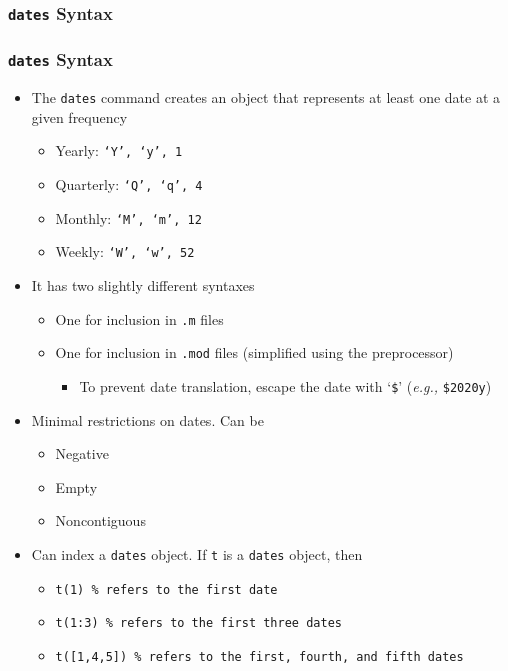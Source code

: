 \documentclass[10pt]{beamer}
\begin{document}
\subsubsection{\texttt{dates} Syntax}
\begin{frame}[fragile,t]
  \frametitle{\texttt{dates} Syntax}
  \begin{itemize}
  \item The \texttt{dates} command creates an object that represents at least one date at a given frequency
    \begin{itemize}
    \item Yearly: \texttt{`Y', `y', 1}
    \item Quarterly: \texttt{`Q', `q', 4}
    \item Monthly: \texttt{`M', `m', 12}
    \item Weekly: \texttt{`W', `w', 52}
    \end{itemize}
  \item It has two slightly different syntaxes
    \begin{itemize}
    \item One for inclusion in \texttt{.m} files
    \item One for inclusion in \texttt{.mod} files (simplified using the preprocessor)
      \begin{itemize}
        \item To prevent date translation, escape the date with `\texttt{\$}' (\textit{e.g.,} \texttt{\$2020y})
      \end{itemize}
    \end{itemize}
  \item Minimal restrictions on dates. Can be
    \begin{itemize}
      \item Negative
      \item Empty
      \item Noncontiguous
    \end{itemize}
  \item Can index a \texttt{dates} object. If \texttt{t} is a \texttt{dates} object, then
    \begin{itemize}
    \item \texttt{t(1) \% refers to the first date}
    \item \texttt{t(1:3) \% refers to the first three dates}
    \item \texttt{t([1,4,5]) \% refers to the first, fourth, and fifth dates}
    \end{itemize}
  \end{itemize}
\end{frame}
\end{document}
